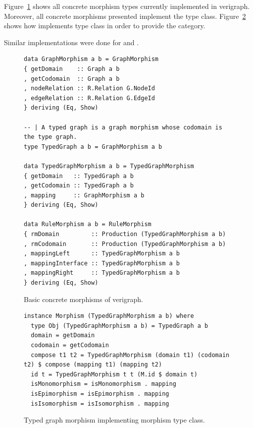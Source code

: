 Figure~\ref{fig:verigraph:concrete-morphisms} shows all concrete morphism types currently implemented in verigraph. Moreover, all concrete morphisms presented implement the  type class. Figure~\ref{fig:verigraph:morphism-implementation} shows how  implements  type class in order to provide the  category.

Similar implementations were done for  and .

\begin{figure}[!ht]
\caption{Basic concrete morphisms of verigraph.}
\begin{verbatim}
data GraphMorphism a b = GraphMorphism 
{ getDomain    :: Graph a b
, getCodomain  :: Graph a b
, nodeRelation :: R.Relation G.NodeId
, edgeRelation :: R.Relation G.EdgeId
} deriving (Eq, Show)

-- | A typed graph is a graph morphism whose codomain is the type graph.
type TypedGraph a b = GraphMorphism a b

data TypedGraphMorphism a b = TypedGraphMorphism 
{ getDomain   :: TypedGraph a b
, getCodomain :: TypedGraph a b
, mapping     :: GraphMorphism a b
} deriving (Eq, Show)

data RuleMorphism a b = RuleMorphism 
{ rmDomain         :: Production (TypedGraphMorphism a b)
, rmCodomain       :: Production (TypedGraphMorphism a b)
, mappingLeft      :: TypedGraphMorphism a b
, mappingInterface :: TypedGraphMorphism a b
, mappingRight     :: TypedGraphMorphism a b
} deriving (Eq, Show)
\end{verbatim}
\label{fig:verigraph:concrete-morphisms}
\end{figure}

\begin{figure}[!ht]
\caption{Typed graph morphism implementing morphism type class.}
\begin{verbatim}
instance Morphism (TypedGraphMorphism a b) where
  type Obj (TypedGraphMorphism a b) = TypedGraph a b
  domain = getDomain
  codomain = getCodomain
  compose t1 t2 = TypedGraphMorphism (domain t1) (codomain t2) $ compose (mapping t1) (mapping t2)
  id t = TypedGraphMorphism t t (M.id $ domain t)
  isMonomorphism = isMonomorphism . mapping
  isEpimorphism = isEpimorphism . mapping
  isIsomorphism = isIsomorphism . mapping

\end{verbatim}
\label{fig:verigraph:morphism-implementation}
\end{figure}

